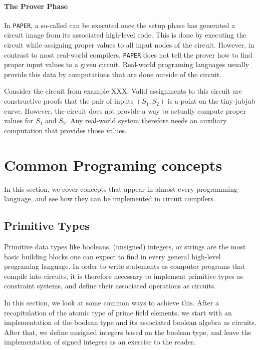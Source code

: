 \paragraph{The Prover Phase} In \texttt{PAPER}, a so-called  can be executed once the setup phase has generated a circuit image from its associated high-level code. This is done by executing the circuit while assigning proper values to all input nodes of the circuit. However, in contrast to most real-world compilers, \texttt{PAPER} does not tell the prover how to find proper input values to a given circuit. Real-world programing languages usually provide this data by computations that are done outside of the circuit.
\begin{example} Consider the circuit from example XXX. Valid assignments to this circuit are constructive proofs that the pair of inputs $(S_1,S_2)$ is a point on the tiny-jubjub curve. However, the circuit does not provide a way to actually compute proper values for $S_1$ and $S_2$. Any real-world system therefore needs an auxiliary computation that provides those values.
\end{example}
\section{Common Programing concepts}
In this section, we cover concepts that appear in almost every programming language, and see how they can be implemented in circuit compilers. 
\subsection{Primitive Types} 
Primitive data types like booleans, (unsigned) integers, or strings are the most basic building blocks one can expect to find in every general high-level programing language. In order to write statements as computer programs that compile into circuits, it is therefore necessary to implement primitive types as constraint systems, and define their associated operations as circuits.

In this section, we look at some common ways to achieve this. After a recapitulation of the atomic type of prime field elements, we start with an implementation of the boolean type and its associated boolean algebra as circuits. After that, we define unsigned integers based on the boolean type, and leave the implementation of signed integers as an exercise to the reader. 


